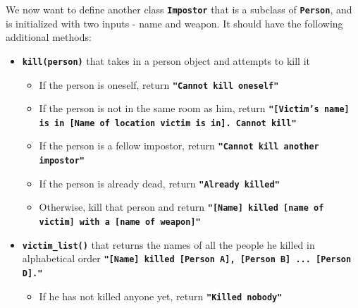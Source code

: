 We now want to define another class \texttt{\bfseries Impostor} that is a subclass of \texttt{\bfseries Person}, and is
initialized with two inputs - name and weapon. It should have the following additional methods:
\begin{itemize}
\item \texttt{\bfseries kill(person)} that takes in a person object and attempts to kill it
\begin{itemize}
\item If the person is oneself, return \texttt{\bfseries "Cannot kill oneself"}
\item If the person is not in the same room as him, return \texttt{\bfseries "[Victim's name] is
in [Name of location victim is in]. Cannot kill"}
\item If the person is a fellow impostor, return \texttt{\bfseries "Cannot kill another impostor"}
\item If the person is already dead, return \texttt{\bfseries "Already killed"}
\item Otherwise, kill that person and return \texttt{\bfseries "[Name] killed [name of victim] with a [name of weapon]"}
\end{itemize}
\item \texttt{\bfseries victim\_list()} that returns the names of all the people he killed in alphabetical
order \texttt{\bfseries "[Name] killed [Person A], [Person B] ... [Person D]."}
\begin{itemize}
\item If he has not killed anyone yet, return \texttt{\bfseries "Killed nobody"}
\end{itemize}
\end{itemize}

